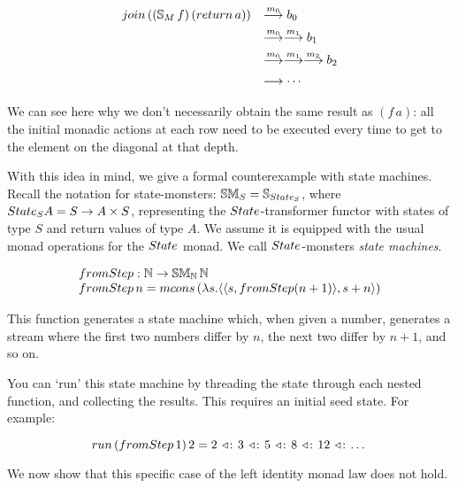 $$
\begin{array}{ll}
\join\,((\stream{M}\,f)\,(\return\,a))
& \larrow{m_0} b_0\\[5pt]
& \larrow{m_0}\larrow{m_1} b_1\\[5pt]
& \larrow{m_0}\larrow{m_1}\larrow{m_2} b_2\\[5pt]
& \larrow{} \cdots
\end{array}
$$

We can see here why we don't necessarily obtain the same result as $(f\,a)$: all the initial monadic actions at each row need to be executed every time to get to the element on the diagonal at that depth.

With this idea in mind, we give a formal counterexample with state machines.
Recall the notation for state-monsters: $\stmon{S} = \stream{\state_S}$, where $\state_S A = S \rightarrow A \times S$, representing the $\state$-transformer functor with states of type $S$ and return values of type $A$. 
We assume it is equipped with the usual monad operations for the $\state$ monad. We call $\state$-monsters  {\em state machines}.

$$
\begin{array}{l}
\fromstepstr : \nat \rightarrow \stmon{\nat}\,\nat \\
\fromstepstr\, n = \mcons\, (\lambda s. \pair{\pair{s}{\fromstepstr (n + 1)}}{s + n})
\end{array}
$$

This function generates a state machine which, when given a number, generates a stream where the first two numbers differ by $n$, the next two differ by $n + 1$, and so on.

You can `run' this state machine by threading the state through each nested function, and collecting the results. This requires an initial seed state. For example:

$$
\strun\,(\fromstepstr\, 1)\, 2 = 2\, \acons\, 3\, \acons\, 5\, \acons\, 8\, \acons\, 12\, \acons\, \dots
$$

We now show that this specific case of the left identity monad law does not hold. 

